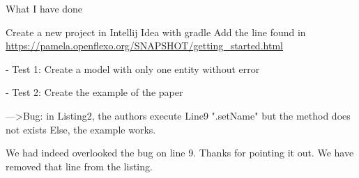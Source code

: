 \documentclass[10pt]{article}
\begin{document}
\begin{response}{
What I have done

Create a new project in Intellij Idea with gradle
Add the line found in \url{https://pamela.openflexo.org/SNAPSHOT/getting_started.html}

- Test 1: Create a model with only one entity without error

- Test 2: Create the example of the paper

--->Bug: in Listing2, the authors execute Line9 ".setName" but the method does not exists
Else, the example works.


}
We had indeed overlooked the bug on line 9. Thanks for pointing it out. We have removed that line from the listing.
\end{response}
\end{document}
